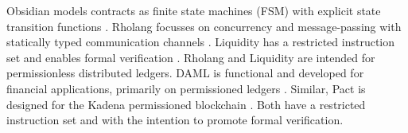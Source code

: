 Obsidian models contracts as finite state machines (FSM) with explicit state transition functions \cite{Coblenz2017}.
Rholang focusses on concurrency and message-passing with statically typed communication channels \cite{Meredith2018}.
Liquidity has a restricted instruction set and enables formal verification \cite{OCamlProSAS2018}.
Rholang and Liquidity are intended for permissionless distributed ledgers.
DAML is functional and developed for financial applications, primarily on permissioned ledgers \cite{Shaul2018,Meier2018,Lippmeier2018,Huschenbett2018,Bernauer2018,Maric2018,Bleikertz2018,Lochbihler2018,Pilav2018}.
Similar, Pact is designed for the Kadena permissioned blockchain \cite{Popejoy2017}.
Both have a restricted instruction set and with the intention to promote formal verification.


